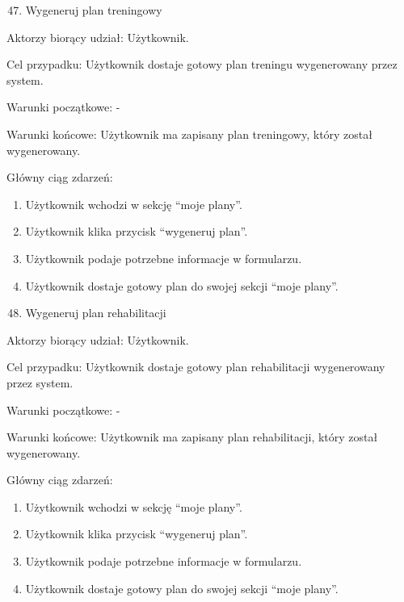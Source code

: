 \documentclass[
]{article}
\providecommand{\tightlist}{%
  \setlength{\itemsep}{0pt}\setlength{\parskip}{0pt}}
\begin{document}
{}

\begin{enumerate}
\setcounter{enumi}{46}
\tightlist
\item
  {Wygeneruj plan treningowy}
\end{enumerate}

{Aktorzy biorący udział: Użytkownik.}

{Cel przypadku: Użytkownik dostaje gotowy plan treningu wygenerowany
przez system.}

{Warunki początkowe: -}

{Warunki końcowe: Użytkownik ma zapisany plan treningowy, który został
wygenerowany.}

{Główny ciąg zdarzeń:}

\begin{enumerate}
\tightlist
\item
  {Użytkownik wchodzi w sekcję ``moje plany''.}
\item
  {Użytkownik klika przycisk ``wygeneruj plan''.}
\item
  {Użytkownik podaje potrzebne informacje w formularzu.}
\item
  {Użytkownik dostaje gotowy plan do swojej sekcji ``moje plany''.}
\end{enumerate}

{}

\begin{enumerate}
\setcounter{enumi}{47}
\tightlist
\item
  {Wygeneruj plan rehabilitacji}
\end{enumerate}

{Aktorzy biorący udział: Użytkownik.}

{Cel przypadku: Użytkownik dostaje gotowy plan rehabilitacji
wygenerowany przez system.}

{Warunki początkowe: -}

{Warunki końcowe: Użytkownik ma zapisany plan rehabilitacji, który
został wygenerowany.}

{Główny ciąg zdarzeń:}

\begin{enumerate}
\tightlist
\item
  {Użytkownik wchodzi w sekcję ``moje plany''.}
\item
  {Użytkownik klika przycisk ``wygeneruj plan''.}
\item
  {Użytkownik podaje potrzebne informacje w formularzu.}
\item
  {Użytkownik dostaje gotowy plan do swojej sekcji ``moje plany''.}
\end{enumerate}
\end{document}
